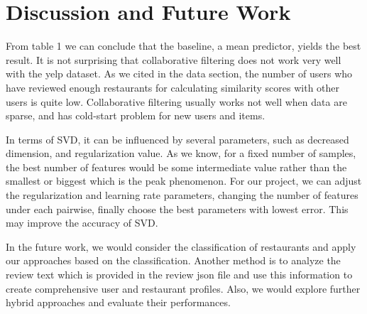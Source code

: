 \documentclass{llncs}
\begin{document}
\section{Discussion and Future Work}
From table 1 we can conclude that the baseline, a mean predictor, yields the best result. It is not surprising that collaborative filtering does not work very well with the yelp dataset. As we cited in the data section, the number of users who have reviewed enough restaurants for calculating similarity scores with other users is quite low. Collaborative filtering usually works not well when data are sparse, and has cold-start problem for new users and items.

In terms of SVD, it can be influenced by several parameters, such as decreased dimension, and regularization value. As we know, for a fixed number of samples, the best number of features would be some intermediate value rather than the smallest or biggest which is the peak phenomenon. For our project, we can adjust the regularization and learning rate parameters, changing the number of features under each pairwise, finally choose the best parameters with lowest error. This may improve the accuracy of SVD.
 
In the future work, we would consider the classification of restaurants and apply our approaches based on the classification. Another method is to analyze the review text which is provided in the review json file and use this information to create comprehensive user and restaurant profiles. Also, we would explore further hybrid approaches and evaluate their performances.
\end{document}
